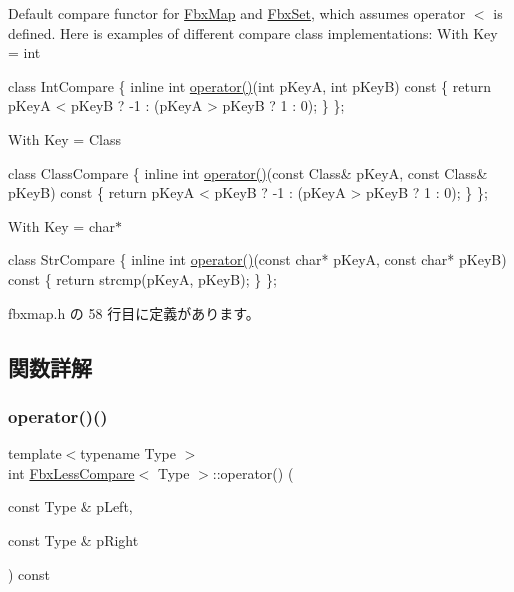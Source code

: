 Default compare functor for \hyperlink{class_fbx_map}{Fbx\+Map} and \hyperlink{class_fbx_set}{Fbx\+Set}, which assumes operator $<$ is defined. Here is examples of different compare class implementations\+: With Key = int 
\begin{DoxyCode}
\textcolor{keyword}{class }IntCompare
\{
    \textcolor{keyword}{inline} \textcolor{keywordtype}{int} \hyperlink{struct_fbx_less_compare_ae928c1cd53fbd36a8ed7497b4d6accc9}{operator()}(\textcolor{keywordtype}{int} pKeyA, \textcolor{keywordtype}{int} pKeyB)\textcolor{keyword}{ const}
\textcolor{keyword}{    }\{
        \textcolor{keywordflow}{return} pKeyA < pKeyB ? -1 : (pKeyA > pKeyB ? 1 : 0);
    \}
\};
\end{DoxyCode}
 With Key = Class 
\begin{DoxyCode}
\textcolor{keyword}{class }ClassCompare
\{
    \textcolor{keyword}{inline} \textcolor{keywordtype}{int} \hyperlink{struct_fbx_less_compare_ae928c1cd53fbd36a8ed7497b4d6accc9}{operator()}(\textcolor{keyword}{const} Class& pKeyA, \textcolor{keyword}{const} Class& pKeyB)\textcolor{keyword}{ const}
\textcolor{keyword}{    }\{
        \textcolor{keywordflow}{return} pKeyA < pKeyB ? -1 : (pKeyA > pKeyB ? 1 : 0);
    \}
\};
\end{DoxyCode}
 With Key = char$\ast$ 
\begin{DoxyCode}
\textcolor{keyword}{class }StrCompare
\{
    \textcolor{keyword}{inline} \textcolor{keywordtype}{int} \hyperlink{struct_fbx_less_compare_ae928c1cd53fbd36a8ed7497b4d6accc9}{operator()}(\textcolor{keyword}{const} \textcolor{keywordtype}{char}* pKeyA, \textcolor{keyword}{const} \textcolor{keywordtype}{char}* pKeyB)\textcolor{keyword}{ const}
\textcolor{keyword}{    }\{
        \textcolor{keywordflow}{return} strcmp(pKeyA, pKeyB);
    \}
\};
\end{DoxyCode}
 

 fbxmap.\+h の 58 行目に定義があります。



\subsection{関数詳解}
\mbox{\label{struct_fbx_less_compare_ae928c1cd53fbd36a8ed7497b4d6accc9}} 
\subsubsection{\texorpdfstring{operator()()}{operator()()}}
{\footnotesize\ttfamily template$<$typename Type $>$ \\
int \hyperlink{struct_fbx_less_compare}{Fbx\+Less\+Compare}$<$ Type $>$\+::operator() (\begin{DoxyParamCaption}\item[{const Type \&}]{p\+Left,  }\item[{const Type \&}]{p\+Right }\end{DoxyParamCaption}) const\hspace{0.3cm}{\ttfamily [inline]}}



